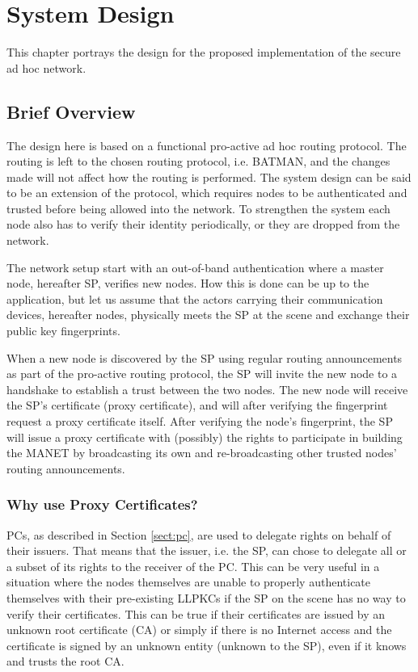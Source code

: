 \chapter{System Design}
\label{ch:design}
\acresetall

This chapter portrays the design for the proposed implementation of the secure
ad hoc network.

\section{Brief Overview}
The design here is based on a functional pro-active ad hoc routing protocol. The
routing is left to the chosen routing protocol, i.e. \ac{BATMAN}, and the
changes made will not affect how the routing is performed. The system design can
be said to be an extension of the protocol, which requires nodes to be
authenticated and trusted before being allowed into the network. To strengthen
the system each node also has to verify their identity periodically, or they are
dropped from the network.

The network setup start with an out-of-band authentication where a master node,
hereafter \ac{SP}, verifies new nodes. How this is done can be up to the
application, but let us assume that the actors carrying their communication
devices, hereafter nodes, physically meets the \ac{SP} at the scene and
exchange their public key fingerprints.

When a new node is discovered by the \ac{SP} using regular routing announcements
as part of the pro-active routing protocol, the \ac{SP} will invite the new node
to a handshake to establish a trust between the two nodes. The new node will
receive the \ac{SP}'s certificate (proxy certificate), and will after verifying
the fingerprint request a proxy certificate itself. After verifying the node's
fingerprint, the \ac{SP} will issue a proxy certificate with (possibly) the
rights to participate in building the \ac{MANET} by broadcasting its own and
re-broadcasting other trusted nodes' routing announcements.

\subsection{Why use Proxy Certificates?}
\acp{PC}, as described in Section \ref{sect:pc}, are used to delegate
rights on behalf of their issuers. That means that the issuer, i.e. the \ac{SP},
can chose to delegate all or a subset of its rights to the receiver of the
\ac{PC}. This can be very useful in a situation where the nodes themselves are
unable to properly authenticate themselves with their pre-existing \acp{LLPKC}
if the \ac{SP} on the scene has no way to verify their certificates. This can be
true if their certificates are issued by an unknown root certificate (\ac{CA})
or simply if there is no Internet access and the certificate is signed by an
unknown entity (unknown to the \ac{SP}), even if it knows and trusts the root
\ac{CA}.

